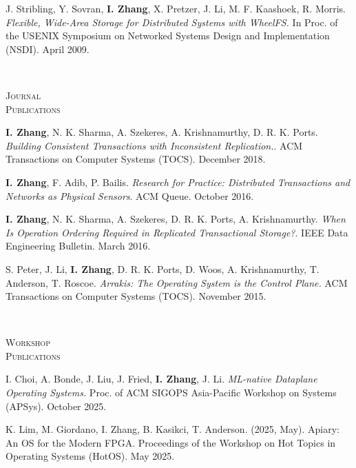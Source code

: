 \documentclass[10pt,times]{report}
\newlength{\sectiongap}
\newlength{\sectioncolwidth}
\newlength{\colgap}
\newlength{\stuffwidth}
\newenvironment{rtable}{
  \begin{minipage}{\textwidth}
  }{
  \end{minipage}
}
\newenvironment{rsection}[1]{
  \begin{minipage}[t]{\sectioncolwidth}
    \textsc{#1}
  \end{minipage}
  \hspace{\colgap}
  \begin{minipage}[t]{\stuffwidth}
  }{
    \removelastskip
  \end{minipage}
  \\[\sectiongap]
}
\begin{document}
\begin{rtable}
\begin{rsection} {}
    J. Stribling, Y. Sovran, \textbf{I. Zhang}, X. Pretzer, J. Li,
    M. F. Kaashoek, R. Morris. \textit{Flexible, Wide-Area Storage for
      Distributed Systems with WheelFS.}  In Proc. of the USENIX
    Symposium on Networked Systems Design and
    Implementation (NSDI).  April 2009.
  \end{rsection}
  
  \begin{rsection}{Journal\\Publications}
    \textbf{I. Zhang}, N. K. Sharma, A. Szekeres, A. Krishnamurthy,
    D. R. K. Ports. \textit{Building Consistent Transactions with
      Inconsistent Replication.}.  ACM Transactions on Computer
    Systems (TOCS). December 2018. \\\vspace{-0.5em}

    \textbf{I. Zhang}, F. Adib, P. Bailis. \textit{Research for
      Practice: Distributed Transactions and Networks as Physical
      Sensors}. ACM Queue. October 2016.\\\vspace{-0.5em}

    \textbf{I. Zhang}, N. K. Sharma, A. Szekeres,
    D. R. K. Ports, A. Krishnamurthy. \textit{When Is Operation
      Ordering Required in Replicated Transactional Storage?}.  IEEE
    Data Engineering Bulletin. March 2016.\\\vspace{-0.5em}

    S. Peter, J. Li, \textbf{I. Zhang}, D. R. K. Ports, D. Woos,
    A. Krishnamurthy, T. Anderson, T. Roscoe.  \textit{Arrakis: The
      Operating System is the Control Plane.}  ACM Transactions on
    Computer Systems (TOCS). November 2015.
  \end{rsection}
  
  \begin{rsection}{Workshop\\Publications}
    I. Choi, A. Bonde, J. Liu, J. Fried, \textbf{I. Zhang},
    J. Li. \textit{ML-native Dataplane Operating Systems.} Proc. of
    ACM SIGOPS Asia-Pacific Workshop on Systems (APSys). October
    2025. \\\vspace{-0.5em}

    K. Lim, M. Giordano, I. Zhang, B. Kasikci, T. Anderson. (2025,
    May). Apiary: An OS for the Modern FPGA. Proceedings of the
    Workshop on Hot Topics in Operating Systems (HotOS). May
    2025.\\\vspace{-0.5em}


\end{rsection}
\end{rtable}
\end{document}
